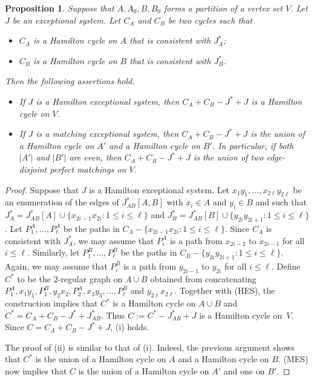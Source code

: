 \documentclass{memo-l}
\newtheorem{prop}[firstthm]{Proposition}
\numberwithin{section}{chapter}
\numberwithin{equation}{section}
\numberwithin{firstthm}{section}
\numberwithin{figure}{section}
\begin{document}
\begin{prop} \label{prop:ES}
Suppose that $A,A_0,B,B_0$ forms a partition of a vertex set $V$.
Let $J$ be an exceptional system. Let $C_A$ and $C_B$ be two cycles such that 
\begin{itemize}
	\item $C_A$ is a Hamilton cycle on $A$ that is consistent with $J_A^*$;
	\item $C_B$ is a Hamilton cycle on $B$ that is consistent with $J_B^*$.
\end{itemize}
Then the following assertions hold. 
\begin{itemize}
	\item[\rm (i)] If $J$ is a Hamilton exceptional system, then $C_A+C_B - J^* +J$ is a Hamilton cycle on $V$.
	\item[\rm (ii)] If $J$ is a  matching exceptional system, then $C_A+C_B - J^* +J$ is the union of a Hamilton cycle on $A'$ and a Hamilton cycle on $B'$.
In particular, if both $|A'|$ and $|B'|$ are even, then $C_A+C_B - J^* +J$ is the union of two edge-disjoint perfect matchings on $V$.
\end{itemize}
\end{prop}
\begin{proof}
Suppose that $J$ is a Hamilton exceptional system.
Let $x_1y_1, \dots, x_{2\ell}y_{2\ell}$ be an enumeration of the edges of $J^*_{AB}[A,B]$ with $x_i \in A$ and $y_i \in B$ and such that
$J_A^* = J^*_{AB}[A] \cup \{x_{2i-1} x_{2i} :1 \le i \le \ell \}$ and $J_B^* = J^*_{AB}[B] \cup \{y_{2i} y_{2i+1} :1 \le i \le \ell \}$.
Let $P_1^A, \dots ,P_\ell^A$ be the paths in $C_A - \{x_{2i-1} x_{2i} : 1 \le i \le \ell \}$.
Since $C_A$ is consistent with $J_A^*$, we may assume that $P_i^A$ is a path from $x_{2i-2}$ to $x_{2i-1}$ for all $i \le \ell$.
Similarly, let $P_1^B, \dots ,P_\ell^B$ be the paths in $C_B - \{y_{2i} y_{2i+1} : 1 \le i \le \ell \}$.
Again, we may assume that $P_i^B$ is a path from $y_{2i-1}$ to $y_{2i}$ for all $i \le \ell$.
Define $C^*$ to be the $2$-regular graph on $A \cup B$ obtained from concatenating $P^A_1,x_1y_1,P^B_1,y_2x_2,P^A_2,x_3y_3, \dots ,P^B_\ell$ and $y_{2\ell}x_{2\ell}$.
Together with (HES), the construction implies that $C^*$ is a Hamilton cycle on $A\cup B$ and $C^*=C_A+C_B - J^*+J^*_{AB}$.
Thus $C:=C^* - J^*_{AB}+J$ is a Hamilton cycle on~$V$. Since $C=C_A+C_B - J^* +J$, (i) holds.

The proof of (ii) is similar to that of (i). Indeed, the previous argument shows that $C^*$ is the union of a Hamilton cycle on $A$ and a Hamilton cycle on $B$. (MES) now implies that $C$ is the union of a Hamilton cycle on $A'$ and one on $B'$.
\end{proof}
\end{document}
